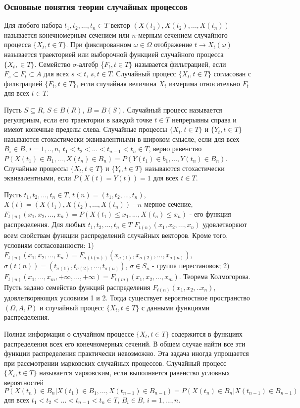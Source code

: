 \subsubsection*{Основные понятия теории случайных процессов}

Для любого набора $t_1, t_2, ..., t_n \in T$ вектор
$(X(t_1), X(t_2),..., X(t_n))$ называется конечномерным сечением или $n$-мерным сечением случайного процесса $\{X_t, t\in T\}$.
При фиксированном $\omega \in \Omega$ отображение $t \rightarrow X_t(\omega)$ называется траекторией или выборочной функцией случайного процесса
$\{X_t,\in T \}$.
Семейство $\sigma$-алгебр \{$F_t, t\in T\}$ называется фильтрацией, если
$F_s \subset F_t \subset A$ для всех $s<t$, $s,t\in T$.
Случайный процесс $\{X_t,t\in T\}$ согласован с фильтрацией $\{F_t,t\in T\}$, если случайная величина $X_t$ измерима относительно $F_t$ для всех $t\in T$.

Пусть $S\subseteq R$, $S\in B(R)$, $B=B(S)$.
Случайный процесс называется регулярным, если его траектории в каждой точке $t\in T$ непрерывны справа и имеют конечные пределы слева.
Случайные процессы $\{X_t,t\in T\}$ и $\{Y_t,t\in T\}$ называются стохастически эквивалентными в широком смысле, если для всех $B_i\in B$, $i=1,..,n$, $t_1<t_2<...<t_{n-1}<t_n\in T$, верно равенство $P(X(t_1)\in B_1,...,X(t_n)\in B_n)=P(Y(t_1)\in b_1,...,Y(t_n)\in B_n)$.
Случайные процессы $\{X_t,t\in T\}$ и $\{Y_t, t\in T\}$ называются стохастически эквивалентными, если $P(X(t)=Y(t))=1$ для всех $t\in T$.

Пусть $t_1,t_2,...,t_n\in T$, $t(n)=(t_1,t_2,...,t_n)$, $X(t)=(X(t_1),X(t_2),...,X(t_n))$ - $n$-мерное сечение, $F_{t(n)}(x_1,x_2,...,x_n)=P(X(t_1)\leq x_1, ...,X(t_n)\leq x_n)$ - его функция распределения.
Для любых $t_1,t_2,...,t_n\in T$ $F_{t(n)}(x_1,x_2,...,x_n)$ удовлетворяют всем свойствам функции распределений случайных векторов.
Кроме того, условиям согласованности:
1) $F_{t(n)}(x_1,x_2,...,x_n)=F_{\sigma (t(n))}(x_{\sigma(1)},x_{\sigma(2)},...,x_{\sigma (n)})$, $\sigma (t(n))=(t_{\sigma (1)}, t_{\sigma (2)}, ..., t_{\sigma (n)})$, $\sigma \in S_n$ - группа перестановок;
2) $F_{t(n)}(x_1,...,x_m,+\infty,...,+\infty)=F_{t(m)}(x_1,x_2,...,x_m)$.
Теорема Колмогорова. Пусть задано семейство функций распределения
$F_{t(n)}(x_1,x_2,..x_n)$, удовлетворяющих условиям 1 и 2.
Тогда существует вероятностное пространство $(\Omega, A, P)$ и случайный процесс $\{X_t,t\in T\}$ с данными функциями распределения.

Полная информация о случайном процессе $\{X_t, t\in T\}$ содержится в функциях распределения всех его конечномерных сечений.
В общем случае найти все эти функции распределения практически невозможно.
Эта задача иногда упрощается при рассмотрении марковских случайных процессов.
Случайный процесс $\{X_t, t\in T\}$ называется марковским, если выполняется равенство условных вероятностей
$P(X(t_n)\in B_n | X(t_1)\in B_1, ..., X(t_{n-1})\in B_{n-1})=P(X(t_n)\in B_n | X(t_{n-1})\in B_{n-1})$ для всех $t_1<t_2<...<t_{n-1}<t_n \in T$, $B_i \in B$, $i=1,...,n$.

